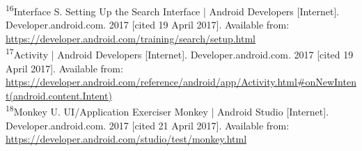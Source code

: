 \documentclass{article}
\begin{document}
\begin{flushleft}
\textsuperscript{16}Interface S. Setting Up the Search Interface | Android Developers [Internet]. Developer.android.com. 2017 [cited 19 April 2017]. Available from: \url{https://developer.android.com/training/search/setup.html}\\
\textsuperscript{17}Activity | Android Developers [Internet]. Developer.android.com. 2017 [cited 19 April 2017]. Available from: \url{https://developer.android.com/reference/android/app/Activity.html#onNewIntent(android.content.Intent)}\\
\textsuperscript{18}Monkey U. UI/Application Exerciser Monkey | Android Studio [Internet]. Developer.android.com. 2017 [cited 21 April 2017]. Available from: \url{https://developer.android.com/studio/test/monkey.html}\\
\end{flushleft}
\end{document}
